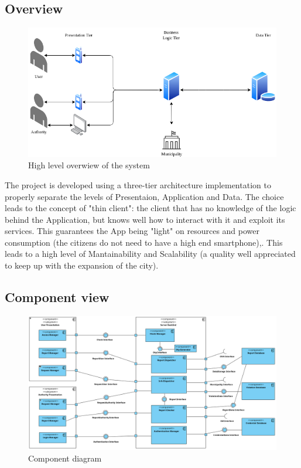 \subsection{Overview}

    \begin{figure}[H]
        \includegraphics[width=\textwidth]{Images/SystemOverview.png}
        \caption{\label{fig:SystemOverview}High level overwiew of the system}
    \end{figure}

    The project is developed using a three-tier architecture implementation to properly separate the levels of Presentaion, Application and Data.
    The choice leads to the concept of "thin client": the client that has no knowledge of the logic behind the Application, but knows well how to interact with it 
    and exploit its services.  This guarantees the App being "light" on resources and power consumption (the citizens do not need to have a high end smartphone),.
    This leads to a high level of Mantainability and Scalability (a quality well appreciated to keep up with the expansion of the city).

\newpage

\subsection{Component view}

    \begin{figure}[H]
        \includegraphics[width=\textwidth]{Images/ComponentView.png}
        \caption{\label{fig:ComponentView}Component diagram}
    \end{figure}


